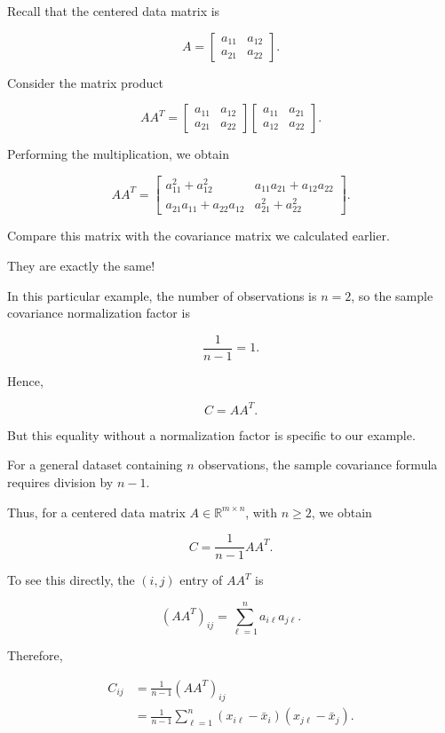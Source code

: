 \documentclass[11pt]{article}
\begin{document}
Recall that the centered
data matrix is

\[
A=
\begin{bmatrix}
a_{11} & a_{12}\\
a_{21} & a_{22}
\end{bmatrix}.
\]

Consider the matrix product

\[
AA^T=
\begin{bmatrix}
a_{11} & a_{12}\\
a_{21} & a_{22}
\end{bmatrix}
\begin{bmatrix}
a_{11} & a_{21}\\
a_{12} & a_{22}
\end{bmatrix}.
\]

Performing the multiplication,
we obtain

\[
\boxed{
AA^T=
\begin{bmatrix}
a_{11}^2+a_{12}^2 &
a_{11}a_{21}+a_{12}a_{22}\\[2mm]
a_{21}a_{11}+a_{22}a_{12} &
a_{21}^2+a_{22}^2
\end{bmatrix}.
}
\]

Compare this matrix with the
covariance matrix we calculated
earlier.

They are exactly the same!

In this particular example,
the number of observations
is $n=2$, so the sample
covariance normalization
factor is

\[
\frac{1}{n-1}=1.
\]

Hence,

\[
C=AA^T.
\]

But this equality without
a normalization factor is
specific to our example.

For a general dataset containing
$n$ observations, the sample
covariance formula requires
division by $n-1$.

Thus, for a centered data
matrix $A\in\mathbb{R}^{m\times n}$,
with $n\geq 2$, we obtain

\[
\boxed{
C=\frac{1}{n-1}AA^T.
}
\]

To see this directly, the
$(i,j)$ entry of $AA^T$ is

\[
(AA^T)_{ij}
=
\sum_{\ell=1}^{n}
a_{i\ell}a_{j\ell}.
\]

Therefore,

\[
\begin{aligned}
C_{ij}
&=\frac{1}{n-1}(AA^T)_{ij}\\
&=\frac{1}{n-1}
\sum_{\ell=1}^{n}
(x_{i\ell}-\bar{x}_i)
(x_{j\ell}-\bar{x}_j).
\end{aligned}
\]
\end{document}
